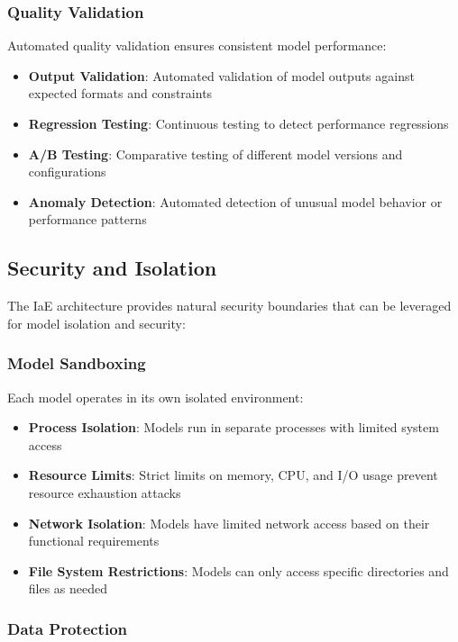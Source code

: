 \subsubsection{Quality Validation}

Automated quality validation ensures consistent model performance:

\begin{itemize}
    \item \textbf{Output Validation}: Automated validation of model outputs against expected formats and constraints
    \item \textbf{Regression Testing}: Continuous testing to detect performance regressions
    \item \textbf{A/B Testing}: Comparative testing of different model versions and configurations
    \item \textbf{Anomaly Detection}: Automated detection of unusual model behavior or performance patterns
\end{itemize}

\subsection{Security and Isolation}

The IaE architecture provides natural security boundaries that can be leveraged for model isolation and security:

\subsubsection{Model Sandboxing}

Each model operates in its own isolated environment:

\begin{itemize}
    \item \textbf{Process Isolation}: Models run in separate processes with limited system access
    \item \textbf{Resource Limits}: Strict limits on memory, CPU, and I/O usage prevent resource exhaustion attacks
    \item \textbf{Network Isolation}: Models have limited network access based on their functional requirements
    \item \textbf{File System Restrictions}: Models can only access specific directories and files as needed
\end{itemize}

\subsubsection{Data Protection}

